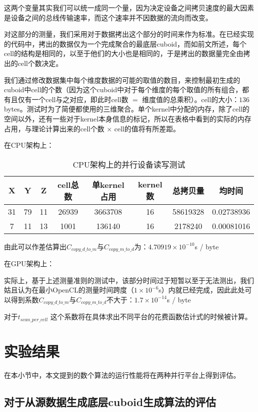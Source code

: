 这两个变量其实我们可以统一成同一个量，因为决定设备之间拷贝速度的最大因素是设备之间的总线传输速率，而这个速率并不因数据的流向而改变。

对这部分的测量，我们采用对于数据拷出这个部分的时间来作为标准。在已经实现的代码中，拷出的数据仅为一个完成聚合的最底层cuboid，而如前文所述，每个cell的结构是相同的，以至于他们的大小也是相同的，于是拷出的数据量完全由拷出的cell个数决定。

我们通过修改数据集中每个维度数据的可能的取值的数目，来控制最初生成的cuboid中cell的个数（因为这个cuboid中对于每个维度的每个取值的所有组合，都有且仅有一个cell与之对应，即此时cell数 $=$ 维度值的总乘积）。cell的大小：$136$ bytes。测试时为了简便都使用的三维聚合。单个kernel中分配的内存，除了cell的空间以外，还有一些对于kernel本身信息的标记，所以在表格中看到的实际的内存占用，与理论计算出来的cell个数 $\times$ cell的值将有所差距。

在CPU架构上：
\begin{table}[!htbp]
\centering
\caption{CPU架构上的并行设备读写测试} 
\label{tab:table3}
\begin{tabular}{|c|c|c|c|c|c|c|c|}
    \hline
    X & Y & Z & cell总数 & 单kernel占用 & kernel数 & 总拷贝量 & 均时间\\
    \hline
    31 & 79 & 11 & 26939 & 3663708 & 16 & 58619328 & 0.02738936\\
    \hline
    7 & 11 & 13 & 1001 & 136140 & 16 & 2178240 & 0.00081016\\
    \hline
\end{tabular}
\end{table}

由此可以作差估算出$C_{copy\_d\_to\_m}$与$C_{copy\_m\_to\_d}$为：$4.70919 \times 10^{-10}$s / byte

在GPU架构上：

实际上，基于上述测量准则的测试中，该部分时间过于短暂以至于无法测出，我们姑且认为在最小OpenCL的测量时间跨度（$1 \times 10^{-6}$s）内就已经完成，因此此处可以得到系数$C_{copy\_d\_to\_m}$与$C_{copy\_m\_to\_d}$不大于：$1.7 \times 10^{-14}$s / byte

对于$t_{scan\_per\_cell}$
这个系数将在具体求出不同平台的花费函数估计式的时候被计算。

\section{实验结果}
在本小节中，本文提到的数个算法的运行性能将在两种并行平台上得到评估。

\subsection{对于从源数据生成底层cuboid生成算法的评估}

